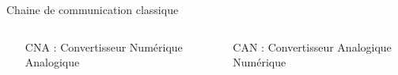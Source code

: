 \documentclass[../main.tex]{subfiles}
\begin{document}
\begin{frame}{Chaine de communication classique}{}
  \begin{columns} \small
    \begin{column}{.45\linewidth}
      \begin{itemize}
        \item [CNA :] Convertisseur Numérique Analogique
      \end{itemize}
    \end{column}
    \begin{column}{.45\linewidth}
      \begin{itemize}
        \item [CAN :] Convertisseur Analogique Numérique
      \end{itemize}
    \end{column}
  \end{columns}
\end{frame}
\end{document}
